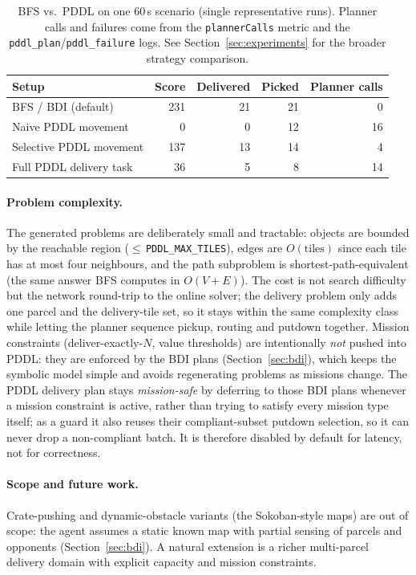 \begin{table}[ht]
\centering\small
\begin{tabular}{@{}lrrrr@{}}
\toprule
Setup & Score & Delivered & Picked & Planner calls \\
\midrule
BFS / BDI (default)        & 231 & 21 & 21 & 0 \\
Naive PDDL movement        &   0 &  0 & 12 & 16 \\
Selective PDDL movement    & 137 & 13 & 14 & 4 \\
Full PDDL delivery task    &  36 &  5 &  8 & 14 \\
\bottomrule
\end{tabular}
\caption{BFS vs.\ PDDL on one $60$\,s scenario (single representative runs).
Planner calls and failures come from the \texttt{plannerCalls} metric and the
\texttt{pddl\_plan}/\texttt{pddl\_failure} logs. See Section~\ref{sec:experiments}
for the broader strategy comparison.}
\label{tab:pddl}
\end{table}

\paragraph{Problem complexity.} The generated problems are deliberately small
and tractable: objects are bounded by the reachable region ($\leq$\,\texttt{PDDL\_MAX\_TILES}),
edges are $O(\mathrm{tiles})$ since each tile has at most four neighbours, and the
path subproblem is shortest-path-equivalent (the same answer BFS computes in
$O(V{+}E)$). The cost is not search difficulty but the network round-trip to the
online solver; the delivery problem only adds one parcel and the delivery-tile
set, so it stays within the same complexity class while letting the planner
sequence pickup, routing and putdown together. Mission constraints
(deliver-exactly-$N$, value thresholds) are intentionally \emph{not} pushed into
PDDL: they are enforced by the BDI plans (Section~\ref{sec:bdi}), which keeps the
symbolic model simple and avoids regenerating problems as missions change. The
PDDL delivery plan stays \emph{mission-safe} by deferring to those BDI plans
whenever a mission constraint is active, rather than trying to satisfy every
mission type itself; as a guard it also reuses their compliant-subset putdown
selection, so it can never drop a non-compliant batch. It is therefore disabled
by default for latency, not for correctness.

\paragraph{Scope and future work.} Crate-pushing and dynamic-obstacle variants
(the Sokoban-style maps) are out of scope: the agent assumes a static known map
with partial sensing of parcels and opponents (Section~\ref{sec:bdi}). A natural
extension is a richer multi-parcel delivery domain with explicit capacity and
mission constraints.
